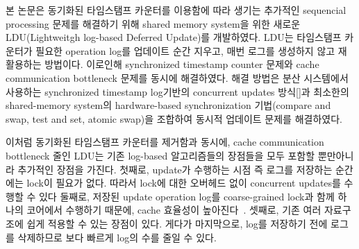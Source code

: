 %
\ifkor
본 논문은 동기화된 타임스탬프 카운터를 이용함에 따라 생기는 추가적인 sequencial processing 문제를
해결하기 위해 shared memory system을 위한 새로운 LDU(Lightweitgh log-based Deferred Update)를
개발하였다.
LDU는 타임스탬프 카운터가 필요한 operation log를 업데이트 순간 지우고, 매번 로그를 생성하지 않고 재활용하는 방법이다.
이로인해 synchronized timestamp counter 문제와 cache communication bottleneck 문제를 동시에
해결하였다.
해결 방법은 분산 시스템에서 사용하는 synchronized timestamp log기반의 concurrent updates 방식[]과
최소한의 shared-memory system의 hardware-based synchronization 기법(compare and swap,
test and set, atomic swap)을 조합하여 동시적 업데이트 문제를 해결하였다.
\else
\fi

\ifkor
이처럼 동기화된 타임스탬프 카운터를 제거함과 동시에, cache communication bottleneck 줄인
LDU는 기존 log-based 알고리즘들의 장점들을 모두 포함할 뿐만아니라 추가적인 장점을 가진다.
첫째로, update가 수행하는 시점 즉 로그를 저장하는 순간에는 lock이 필요가 없다. 
따라서 lock에 대한 오버헤드 없이 concurrent updates를 수행할 수 있다
둘째로, 저장된 update operation log를 coarse-grained lock과 함께 하나의 코어에서 수행하기 때문에,
cache 효율성이 높아진다~\cite{Hendler2010FC}.
셋째로, 기존 여러 자료구조에 쉽게 적용할 수 있는 장점이 있다.
게다가 마지막으로, log를 저장하기 전에 로그를 삭제하므로 보다 빠르게 log의 수를 줄일 수 있다. 
\else
\fi

